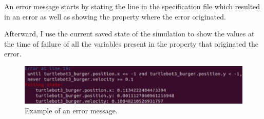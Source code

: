 An error message starts by stating the line in the specification file which resulted in an error as well as showing the property where the error originated.

Afterward, I use the current saved state of the simulation to show the values at the time of failure of all the variables present in the property that originated the error.

\begin{figure}[htb]
\includegraphics[width=\textwidth]{images/error_message1.png}
\caption{Example of an error message.} \label{fig:monerror}
\end{figure}